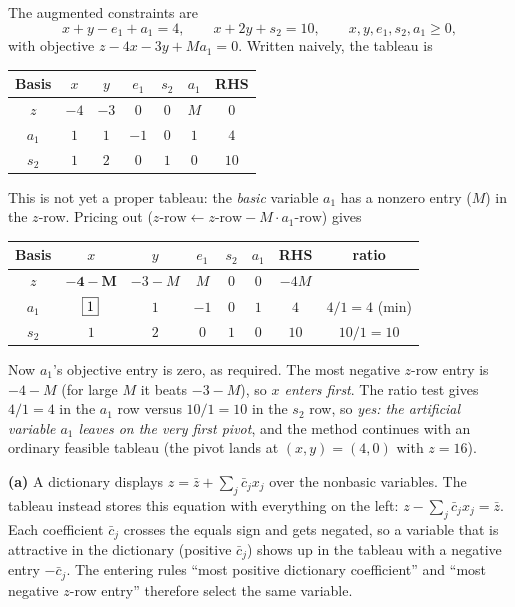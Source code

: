 
The augmented constraints are
\[
x + y - e_1 + a_1 = 4,
\qquad
x + 2y + s_2 = 10,
\qquad
x, y, e_1, s_2, a_1 \geq 0,
\]
with objective $z - 4x - 3y + M a_1 = 0$. Written naively, the tableau is
\begin{center}
\renewcommand{\arraystretch}{1.3}
\begin{tabular}{c|ccccc|c}
Basis & $x$ & $y$ & $e_1$ & $s_2$ & $a_1$ & RHS\\
\hline
$z$   & $-4$ & $-3$ & $0$ & $0$ & $M$ & $0$\\
\hline
$a_1$ & $1$ & $1$ & $-1$ & $0$ & $1$ & $4$\\
$s_2$ & $1$ & $2$ & $0$  & $1$ & $0$ & $10$\\
\end{tabular}
\end{center}
This is not yet a proper tableau: the \emph{basic} variable $a_1$ has a
nonzero entry ($M$) in the $z$-row. Pricing out
($z\text{-row} \leftarrow z\text{-row} - M \cdot a_1\text{-row}$) gives
\begin{center}
\renewcommand{\arraystretch}{1.3}
\begin{tabular}{c|ccccc|c|c}
Basis & $x$ & $y$ & $e_1$ & $s_2$ & $a_1$ & RHS & ratio\\
\hline
$z$   & $\mathbf{-4-M}$ & $-3-M$ & $M$ & $0$ & $0$ & $-4M$ & \\
\hline
$a_1$ & $\fbox{1}$ & $1$ & $-1$ & $0$ & $1$ & $4$ & $4/1 = 4$ (min)\\
$s_2$ & $1$ & $2$ & $0$  & $1$ & $0$ & $10$ & $10/1 = 10$\\
\end{tabular}
\end{center}
Now $a_1$'s objective entry is zero, as required. The most negative
$z$-row entry is $-4 - M$ (for large $M$ it beats $-3 - M$), so
\emph{$x$ enters first}. The ratio test gives $4/1 = 4$ in the $a_1$ row
versus $10/1 = 10$ in the $s_2$ row, so \emph{yes: the artificial
variable $a_1$ leaves on the very first pivot}, and the method continues
with an ordinary feasible tableau (the pivot lands at $(x, y) = (4, 0)$
with $z = 16$).


\textbf{(a)} A dictionary displays $z = \bar z + \sum_j \bar c_j x_j$ over
the nonbasic variables. The tableau instead stores this equation with
everything on the left: $z - \sum_j \bar c_j x_j = \bar z$. Each
coefficient $\bar c_j$ crosses the equals sign and gets negated, so a
variable that is attractive in the dictionary (positive $\bar c_j$) shows
up in the tableau with a negative entry $-\bar c_j$. The entering rules
``most positive dictionary coefficient'' and ``most negative $z$-row
entry'' therefore select the same variable.

